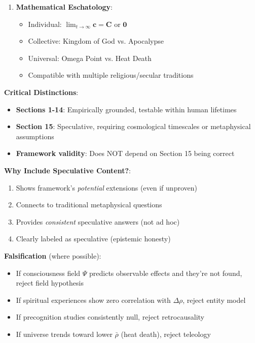 \documentclass[11pt,a4paper]{article}
\theoremstyle{definition}
\theoremstyle{remark}
\newcommand{\cc}{\mathbf{c}}
\begin{document}
\begin{enumerate}
\begin{mdframed}[backgroundcolor=green!10,linewidth=2pt,linecolor=green!70!black]
\begin{enumerate}[nosep]
    \item \textbf{Mathematical Eschatology}:
        \begin{itemize}[nosep]
            \item Individual: \(\lim_{t \to \infty} \cc = \mathbf{C}\) or \(\mathbf{0}\)
            \item Collective: Kingdom of God vs. Apocalypse
            \item Universal: Omega Point vs. Heat Death
            \item Compatible with multiple religious/secular traditions
        \end{itemize}
\end{enumerate}

\textbf{Critical Distinctions}:
\begin{itemize}[nosep]
    \item \textbf{Sections 1-14}: Empirically grounded, testable within human lifetimes
    \item \textbf{Section 15}: Speculative, requiring cosmological timescales or metaphysical assumptions
    \item \textbf{Framework validity}: Does NOT depend on Section 15 being correct
\end{itemize}

\textbf{Why Include Speculative Content?}:
\begin{enumerate}[nosep]
    \item Shows framework's \textit{potential} extensions (even if unproven)
    \item Connects to traditional metaphysical questions
    \item Provides \textit{consistent} speculative answers (not ad hoc)
    \item Clearly labeled as speculative (epistemic honesty)
\end{enumerate}

\textbf{Falsification} (where possible):
\begin{itemize}[nosep]
    \item If consciousness field \(\Psi\) predicts observable effects and they're not found, reject field hypothesis
    \item If spiritual experiences show zero correlation with \(\Delta\rho\), reject entity model
    \item If precognition studies consistently null, reject retrocausality
    \item If universe trends toward lower \(\bar{\rho}\) (heat death), reject teleology
\end{itemize}


\end{mdframed}
\end{enumerate}
\end{document}
